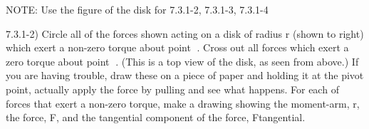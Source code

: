 \label{fnt7.3.1-2}

NOTE: Use the figure of the disk for \FNTs{} 7.3.1-2, 7.3.1-3, 7.3.1-4

7.3.1-2) Circle all of the forces shown acting on a disk of radius r (shown to right) which exert a non-zero torque about point .  Cross out all forces which exert a zero torque about point .  (This is a top view of the disk, as seen from above.)  If you are having trouble, draw these on a piece of paper and holding it at the pivot point, actually apply the force by pulling and see what happens.  For each of forces that exert a non-zero torque, make a drawing showing the moment-arm, r, the force, F, and the tangential component of the force, Ftangential.